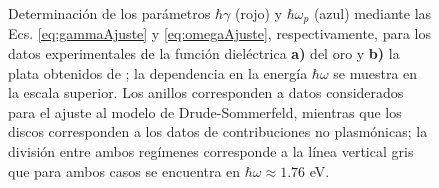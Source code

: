 \begin{figure}[h!]
\begin{subfigure}{.45\linewidth}
	\end{subfigure}\vspace*{-.7em}
	\caption{ Determinación de los parámetros $\hbar\gamma$ (rojo) y $\hbar\omega_p$ (azul) mediante las Ecs. \eqref{eq:gammaAjuste} y \eqref{eq:omegaAjuste}, respectivamente, para los datos experimentales de la función dieléctrica \textbf{a)} del oro y \textbf{b)} la plata obtenidos de \cite{johnson1972constants}; la dependencia en la energía $\hbar\omega$ se muestra en la escala superior. Los anillos corresponden a datos considerados para el ajuste al modelo de Drude-Sommerfeld, mientras que los discos corresponden a los datos de contribuciones no plasmónicas; la división entre ambos regímenes corresponde a la línea vertical gris que para ambos casos se encuentra en $\hbar\omega\approx 1.76$ eV.}\label{fig:FitDrude}
	\end{figure}	


